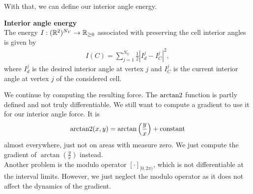With that, we can define our interior angle energy. 
\begin{definition} \textbf{Interior angle energy} \\
	The energy $I: (\mathbb{R}^2)^{N_V} \rightarrow \mathbb{R}_{\geq 0}$ associated with preserving the cell interior angles is given by
	\begin{align}
		I(C) = \sum\limits_{j=1}^{N_V} \frac{1}{2}| I^{j}_d - I^j_{C} |^2, 
	\end{align}
	where $I^{j}_d$ is the desired interior angle at vertex $j$ and $I^j_{C}$ is the current interior angle at vertex $j$ of the considered cell. 
\end{definition}


We continue by computing the resulting force. 
The $\operatorname{arctan2}$ function is partly defined and not truly differentiable. 
We still want to compute a gradient to use it for our interior angle force. 
It is $$\operatorname{arctan2}(x,y) = \arctan\left(\frac{y}{x} \right) + \text{constant}$$ almost everywhere, just not on areas with measure zero. 
We just compute the gradient of $\arctan(\frac{y}{x})$ instead. \\
Another problem is the modulo operator $[ \cdot ]_{[0,2\pi)}$, which is not differentiable at the interval limits.
However, we just neglect the modulo operator as it does not affect the dynamics of the gradient.

